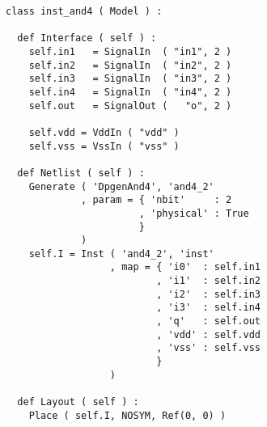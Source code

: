 \begin{itemize}
\begin{verbatim}
class inst_and4 ( Model ) :

  def Interface ( self ) :
    self.in1   = SignalIn  ( "in1", 2 )
    self.in2   = SignalIn  ( "in2", 2 )
    self.in3   = SignalIn  ( "in3", 2 )
    self.in4   = SignalIn  ( "in4", 2 )
    self.out   = SignalOut (   "o", 2 )

    self.vdd = VddIn ( "vdd" )
    self.vss = VssIn ( "vss" )
    
  def Netlist ( self ) :
    Generate ( 'DpgenAnd4', 'and4_2'
             , param = { 'nbit'     : 2
                       , 'physical' : True
                       }
             )      
    self.I = Inst ( 'and4_2', 'inst'                  
                  , map = { 'i0'  : self.in1
                          , 'i1'  : self.in2
                          , 'i2'  : self.in3
                          , 'i3'  : self.in4
                          , 'q'   : self.out
                          , 'vdd' : self.vdd
                          , 'vss' : self.vss
                          }
                  )
    
  def Layout ( self ) :
    Place ( self.I, NOSYM, Ref(0, 0) )
\end{verbatim}
\end{itemize}
